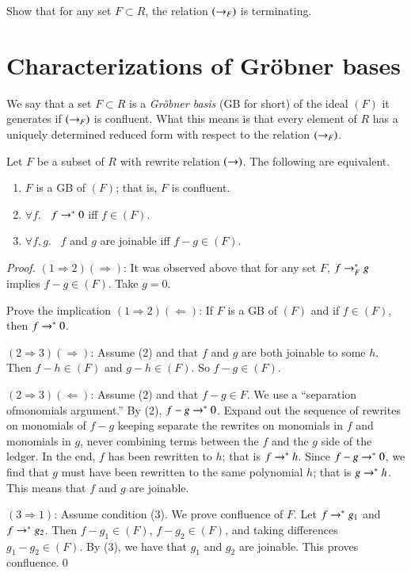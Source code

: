 \documentclass{llncs}
\begin{document}
\begin{problem}
Show that for any set $F\subset R$, the relation $(\rightarrow_F)$ is terminating.
\end{problem}

\section{Characterizations of Gr\"obner bases}

We say that a set $F\subset R$ is a {\it Gr\"obner basis} (GB for short)
of the ideal $(F)$ it generates if $(\rightarrow_F)$ is confluent.  What this means is that every element of $R$ has a uniquely determined reduced form with respect to the relation $(\rightarrow_F)$.

\begin{lemma} Let $F$ be a subset of $R$ with rewrite relation $(\rightarrow)$.  
The following are equivalent.
\begin{enumerate} 
\item $F$ is a GB of $(F)$; that is, $F$ is confluent.
\item $\forall f$.~  $f\rightarrow^* 0$ iff $f\in (F)$.
\item $\forall f,g$.~ $f$ and $g$ are joinable iff $f-g\in (F)$.
\end{enumerate}
\end{lemma}


\begin{proof}
$(1\Rightarrow 2)(\Rightarrow)$:  It was observed above that for any set $F$,
$f\rightarrow^*_F g$ implies $f - g\in (F)$.  Take $g=0$.

\begin{problem}  Prove the implication
$(1\Rightarrow 2)(\Leftarrow)$:  If $F$ is a GB of $(F)$ and if $f\in (F)$, then $f\rightarrow^* 0$.
\end{problem}

$(2\Rightarrow 3)(\Rightarrow)$:  Assume (2) and that $f$ and $g$ are both joinable to some $h$.  Then $f-h\in (F)$ and $g-h\in (F)$.  So $f-g\in (F)$.

$(2\Rightarrow 3)(\Leftarrow)$:  Assume (2) and that $f-g\in F$.  We use a ``separation ofmonomials argument.''   By (2), $f-g\rightarrow^* 0$.  Expand out the sequence of rewrites on monomials of $f-g$ keeping separate the rewrites on monomials in $f$ and monomials in $g$, never combining terms between the $f$ and the $g$ side of the ledger.  In the end, $f$ has been rewritten to $h$; that is $f\rightarrow^* h$.  Since $f-g\rightarrow^* 0$, we find that $g$ must have been rewritten to the same polynomial $h$; that is $g\rightarrow^* h$.  This means that $f$ and $g$ are joinable.

$(3\Rightarrow 1)$:  Assume condition (3).  We prove confluence of $F$.  Let $f\rightarrow^* g_1$ and $f\rightarrow^* g_2$.  Then $f-g_1\in (F)$, $f-g_2\in (F)$, and taking differences $g_1-g_2\in (F)$.  By (3), we have that $g_1$ and $g_2$ are joinable.  This proves confluence.\qed
\end{proof}
\end{document}
